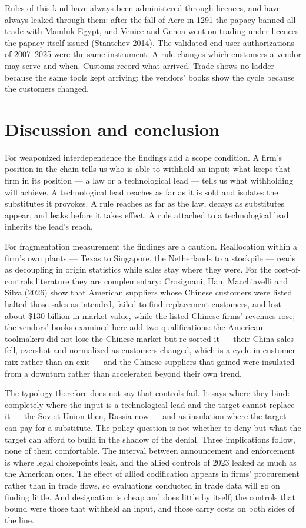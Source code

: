 \documentclass[12pt]{article}
\begin{document}
Rules of this kind have always been administered through licences, and have always leaked through them: after the fall of Acre in 1291 the papacy banned all trade with Mamluk Egypt, and Venice and Genoa went on trading under licences the papacy itself issued (Stantchev 2014). The validated end-user authorizations of 2007--2025 were the same instrument. A rule changes which customers a vendor may serve and when. Customs record what arrived. Trade shows no ladder because the same tools kept arriving; the vendors' books show the cycle because the customers changed.

\FloatBarrier{}
\section{Discussion and conclusion}

For weaponized interdependence the findings add a scope condition. A firm's position in the chain tells us who is able to withhold an input; what keeps that firm in its position --- a law or a technological lead --- tells us what withholding will achieve. A technological lead reaches as far as it is sold and isolates the substitutes it provokes. A rule reaches as far as the law, decays as substitutes appear, and leaks before it takes effect. A rule attached to a technological lead inherits the lead's reach.

For fragmentation measurement the findings are a caution. Reallocation within a firm's own plants --- Texas to Singapore, the Netherlands to a stockpile --- reads as decoupling in origin statistics while sales stay where they were. For the cost-of-controls literature they are complementary: Crosignani, Han, Macchiavelli and Silva (2026) show that American suppliers whose Chinese customers were listed halted those sales as intended, failed to find replacement customers, and lost about \$130 billion in market value, while the listed Chinese firms' revenues rose; the vendors' books examined here add two qualifications: the American toolmakers did not lose the Chinese market but re-sorted it --- their China sales fell, overshot and normalized as customers changed, which is a cycle in customer mix rather than an exit --- and the Chinese suppliers that gained were insulated from a downturn rather than accelerated beyond their own trend.

The typology therefore does not say that controls fail. It says where they bind: completely where the input is a technological lead and the target cannot replace it --- the Soviet Union then, Russia now --- and as insulation where the target can pay for a substitute. The policy question is not whether to deny but what the target can afford to build in the shadow of the denial. Three implications follow, none of them comfortable. The interval between announcement and enforcement is where legal chokepoints leak, and the allied controls of 2023 leaked as much as the American ones. The effect of allied codification appears in firms' procurement rather than in trade flows, so evaluations conducted in trade data will go on finding little. And designation is cheap and does little by itself; the controls that bound were those that withheld an input, and those carry costs on both sides of the line.
\end{document}
